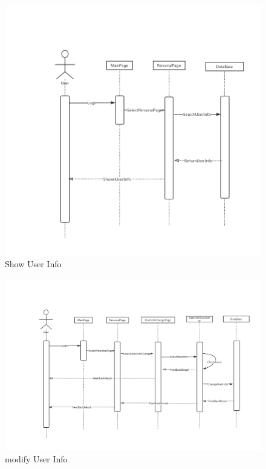 \documentclass[16pt]{scrreprt}
\begin{document}
\begin{figure}[H]
    \includegraphics[width=\linewidth]{./FuncPhoto/3.png}   
    \caption{Show User Info}
\end{figure}

\begin{figure}[H]
    \includegraphics[width=\linewidth]{./FuncPhoto/4.png}   
    \caption{modify User Info}
\end{figure}
\end{document}
